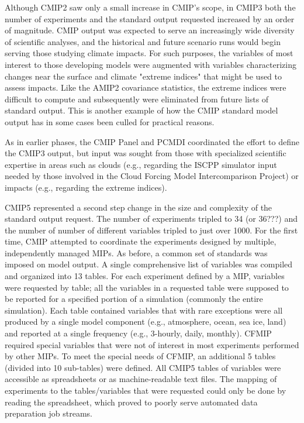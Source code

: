 \documentclass[gmd, preprint]{copernicus}
\begin{document}
{\color{blue}Although CMIP2 saw only a small increase in CMIP's scope, in CMIP3 both the number of experiments and the standard output requested increased by an order of magnitude.  CMIP output was expected to serve an increasingly wide diversity of scientific analyses, and the historical and future scenario runs would begin serving those studying climate impacts. For such purposes, the variables of most interest to those developing models were augmented with variables characterizing changes near the surface and climate "extreme indices" that might be used to assess impacts.  Like the AMIP2 covariance statistics, the extreme indices were difficult to compute and subsequently were eliminated from future lists of standard output.  This is another example of how the CMIP standard model output has in some cases been culled for practical reasons.

As in earlier phases, the CMIP Panel and PCMDI coordinated the effort to define the CMIP3 output, but input was sought from those with specialized scientific expertise in areas such as clouds (e.g., regarding the ISCPP simulator input needed by those involved in the  Cloud Forcing Model Intercomparison Project) or impacts (e.g., regarding the extreme indices).

CMIP5 represented a second step change in the size and complexity of the standard output request. The number of experiments tripled to 34 (or 36???) and the number of number of different variables tripled to just over 1000. For the first time, CMIP attempted to coordinate the experiments designed by multiple, independently managed MIPs.  As before, a common set of standards was imposed on model output.  A single comprehensive list of variables was compiled and organized into 13 tables. For each experiment defined by a MIP, variables were requested by table; all the variables in a requested table were supposed to be reported for a specified portion of a simulation (commonly the entire simulation). Each table contained variables that with rare exceptions were all produced by a single model component (e.g., atmosphere, ocean, sea ice, land) and reported at a single frequency (e.g., 3-hourly, daily, monthly).  CFMIP required special variables that were not of interest in most experiments performed by other MIPs.  To meet the special needs of CFMIP, an additional 5 tables (divided into 10 sub-tables) were defined.  All CMIP5 tables of variables were accessible as spreadsheets or as machine-readable text files.  The mapping of experiments to the tables/variables that were requested could only be done by reading the spreadsheet, which proved to poorly serve automated data preparation job streams.}
\end{document}
